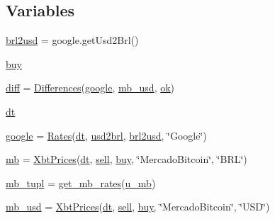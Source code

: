 \subsection*{Variables}
\begin{DoxyCompactItemize}
\item 
\hyperlink{namespaceraw__urlparser_ae7e1c02df9ab0102e017e31885aa6431}{brl2usd} = google.\+get\+Usd2\+Brl()
\item 
\hyperlink{namespaceraw__urlparser_a2b9c66c8d5157cd95ecb738719c8a873}{buy}
\item 
\hyperlink{namespaceraw__urlparser_a86dc49fc55812ccc7eeda441b0fce83c}{diff} = \hyperlink{classraw__urlparser_1_1_differences}{Differences}(\hyperlink{namespaceraw__urlparser_a1b812abf4fbbd8478dca91446c66b646}{google}, \hyperlink{namespaceraw__urlparser_adb426668060d85f4fbd24135e258a8b3}{mb\+\_\+usd}, \hyperlink{namespaceraw__urlparser_aa0dcadbc04ec5d09f7a2dabb865000c8}{ok})
\item 
\hyperlink{namespaceraw__urlparser_acbaf2eef75f4aa43e1f6659c0fd34836}{dt}
\item 
\hyperlink{namespaceraw__urlparser_a1b812abf4fbbd8478dca91446c66b646}{google} = \hyperlink{classraw__urlparser_1_1_rates}{Rates}(\hyperlink{namespaceraw__urlparser_acbaf2eef75f4aa43e1f6659c0fd34836}{dt}, \hyperlink{namespaceraw__urlparser_adb724d2d0b7c561e8b0c53a42831efce}{usd2brl}, \hyperlink{namespaceraw__urlparser_ae7e1c02df9ab0102e017e31885aa6431}{brl2usd}, \char`\"{}Google\char`\"{})
\item 
\hyperlink{namespaceraw__urlparser_a76acf8d303c15079b0560eace3e9720f}{mb} = \hyperlink{classraw__urlparser_1_1_xbt_prices}{Xbt\+Prices}(\hyperlink{namespaceraw__urlparser_acbaf2eef75f4aa43e1f6659c0fd34836}{dt}, \hyperlink{namespaceraw__urlparser_a9f1ba2a5cd520bb41ac4bee751047679}{sell}, \hyperlink{namespaceraw__urlparser_a2b9c66c8d5157cd95ecb738719c8a873}{buy}, \char`\"{}Mercado\+Bitcoin\char`\"{}, \char`\"{}B\+RL\char`\"{})
\item 
\hyperlink{namespaceraw__urlparser_a5d09c5bd4390610ba67d1278a9c66b88}{mb\+\_\+tupl} = \hyperlink{namespaceraw__urlparser_ae2341143e866401a993a5a964610f7a6}{get\+\_\+mb\+\_\+rates}(\hyperlink{namespaceraw__urlparser_a9a840f174b92a24c415b88c87e84b73d}{u\+\_\+mb})
\item 
\hyperlink{namespaceraw__urlparser_adb426668060d85f4fbd24135e258a8b3}{mb\+\_\+usd} = \hyperlink{classraw__urlparser_1_1_xbt_prices}{Xbt\+Prices}(\hyperlink{namespaceraw__urlparser_acbaf2eef75f4aa43e1f6659c0fd34836}{dt}, \hyperlink{namespaceraw__urlparser_a9f1ba2a5cd520bb41ac4bee751047679}{sell}, \hyperlink{namespaceraw__urlparser_a2b9c66c8d5157cd95ecb738719c8a873}{buy}, \char`\"{}Mercado\+Bitcoin\char`\"{}, \char`\"{}U\+SD\char`\"{})

\end{DoxyCompactItemize}
